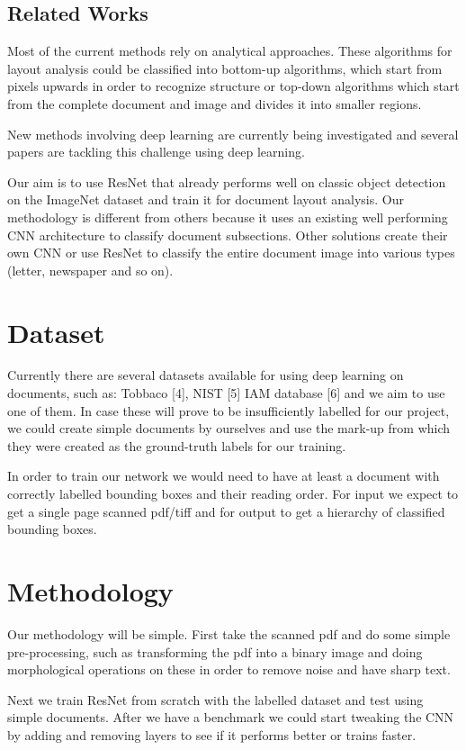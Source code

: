 \documentclass[10pt,twocolumn,letterpaper]{article}
\begin{document}
	\subsection{Related Works}
	Most of the current methods rely on analytical approaches. These algorithms for layout analysis could be classified into bottom-up algorithms, which start from pixels upwards in order to recognize structure or top-down algorithms which start from the complete document and image and divides it into smaller regions.
	
	New methods involving deep learning are currently being investigated and several papers are tackling this challenge using deep learning.
	
	Our aim is to use ResNet that already performs well on classic object detection on the ImageNet dataset and train it for document layout analysis. Our methodology is different from others because it uses an existing well performing CNN architecture to classify document subsections. Other solutions create their own CNN or use ResNet to classify the entire document image into various types (letter, newspaper and so on).
	
	\section{Dataset}
	Currently there are several datasets available for using deep learning on documents, such as: Tobbaco [4], NIST [5] IAM database [6] and we aim to use one of them. In case these will prove to be insufficiently labelled for our project, we could create simple documents by ourselves and use the mark-up from which they were created as the ground-truth labels for our training. 
	
	In order to train our network we would need to have at least a document with correctly labelled bounding boxes and their reading order. For input we expect to get a single page scanned pdf/tiff and for output to get a hierarchy of classified bounding boxes.
	
	\section{Methodology}
	Our methodology will be simple. First take the scanned pdf and do some simple pre-processing, such as transforming the pdf into a binary image and doing morphological operations on these in order to remove noise and have sharp text.
	
	Next we train ResNet from scratch with the labelled dataset and test using simple documents. After we have a benchmark we could start tweaking the CNN by adding and removing layers to see if it performs better or trains faster.
	
\end{document}

